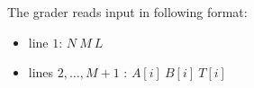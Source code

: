The grader reads input in following format:
\begin{itemize}
\item line $1$: $N\ M\ L$
\item lines $2, \dots, M + 1$ : $A[i]\ B[i]\ T[i]$
\end{itemize}

